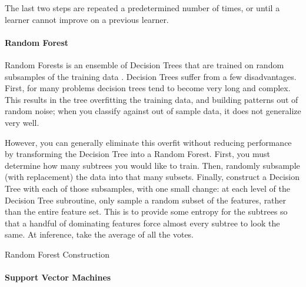 The last two steps are repeated a predetermined number of times, or until a learner cannot improve on a previous learner. 

\paragraph{Random Forest}

Random Forests is an ensemble of Decision Trees that are trained on random subsamples of the training data \cite{breiman01}. Decision Trees suffer from a few disadvantages. First, for many problems decision trees tend to become very long and complex. This results in the tree overfitting the training data, and building patterns out of random noise; when you classify against out of sample data, it does not generalize very well.

However, you can generally eliminate this overfit without reducing performance by transforming the Decision Tree into a Random Forest. First, you must determine how many subtrees you would like to train.
Then, randomly subsample (with replacement) the data into that many subsets. Finally, construct a Decision Tree with each of those subsamples, with one small change: at each level of the Decision Tree subroutine, only sample a random subset of the features, rather than the entire feature set. This is to provide some entropy for the subtrees so that a handful of dominating features force almost every subtree to look the same. At inference, take the average of all the votes.

\begin{algorithm}




\caption{Random Forest Construction \cite{scikit-learn}}
\end{algorithm}

\paragraph{Support Vector Machines}

